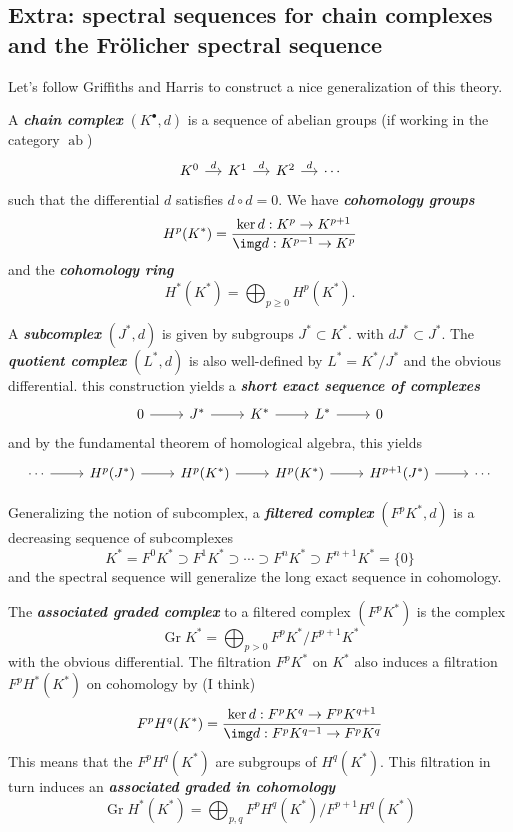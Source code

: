 \begin{remark}
\begin{defn}
\subsection{Extra: spectral sequences for chain complexes and the Fr\"olicher spectral sequence}
Let's follow Griffiths and Harris to construct a nice generalization of this theory.

A \textit{\textbf{chain complex}} $(K^\bullet,d)$ is a sequence of abelian groups (if working in the category $\operatorname{ab}$)
\[\begin{tikzcd}[column sep=small]
	K^{0}\arrow[r,"d"]&K^{1}\arrow[r,"d"]&K^2\arrow[r,"d"]&\cdots
\end{tikzcd}\]
such that the differential $d$ satisfies $d\circ d=0$. We have \textit{\textbf{cohomology groups}} 
\[H^{p}(K^*)=\frac{\ker d:K^p\to K^{p+1}}{\img d:K^{p-1}\to K^p}\]
and the \textit{\textbf{cohomology ring}}
\[H^{*}(K^*)=\bigoplus_{p\geq 0} H^{p}(K^*).\]

A \textit{\textbf{subcomplex}} $(J^*,d)$ is given by subgroups $J^*\subset K^*$. with $dJ^*\subset J^*$. The \textit{\textbf{quotient complex}} $(L^*,d)$ is also well-defined by $L^*=K^*/J^*$ and the obvious differential. this construction yields a \textit{\textbf{short exact sequence of complexes}}
\[\begin{tikzcd}
	0\arrow[r]&J^*\arrow[r]&K^*\arrow[r]&L^*\arrow[r]&0
\end{tikzcd}\]
and by the fundamental theorem of homological algebra, this yields
\[\begin{tikzcd}
	\cdots\arrow[r]&H^{p}(J^*)\arrow[r]&H^{p}(K^*)\arrow[r]&H^{p}(K^*)\arrow[r]&H^{p+1}(J^*)\arrow[r]&\cdots
\end{tikzcd}\]

Generalizing the notion of subcomplex, a \textit{\textbf{filtered complex}} $(F^pK^*,d)$ is a decreasing sequence of subcomplexes
\[K^*=F^0K^*\supset F^1K^*\supset\cdots\supset F^nK^*\supset F^{n+1}K^*=\{0\}\]
and the spectral sequence will generalize the long exact sequence in cohomology.

The \textit{\textbf{associated graded complex}} to a filtered complex $ (F^pK^*)$ is the complex
\[\operatorname{Gr}K^*=\bigoplus_{p>0} F^pK^*/F^{p+1}K^* \]
with the obvious differential. The filtration $F^pK^*$ on $K^*$ also induces a filtration $F^pH^*(K^*)$ on cohomology by {\color{blue}(I think)}
\[F^pH^q(K^*)=\frac{\ker d:F^pK^q\to F^pK^{q+1}}{\img d:F^pK^{q-1}\to F^pK^q}\]
This means that the $F^pH^q(K^*)$ are subgroups of $H^{q}(K^*)$. This filtration in turn induces an \textit{\textbf{associated graded in cohomology}}
\[\operatorname{Gr}H^*(K^*)=\bigoplus_{p,q}F^pH^q(K^*)\big/F^{p+1}H^q(K^*)  \]


\end{defn}
\end{remark}
